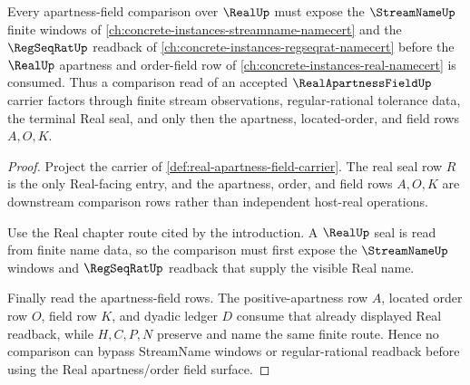 \begin{theorem}
\label{thm:real-apartness-field-streamname-dependency}
Every apartness-field comparison over $\RealUp$ must expose the $\StreamNameUp$ finite windows of \autoref{ch:concrete-instances-streamname-namecert} and the $\RegSeqRatUp$ readback of \autoref{ch:concrete-instances-regseqrat-namecert} before the $\RealUp$ apartness and order-field row of \autoref{ch:concrete-instances-real-namecert} is consumed. Thus a comparison read of an accepted $\RealApartnessFieldUp$ carrier factors through finite stream observations, regular-rational tolerance data, the terminal Real seal, and only then the apartness, located-order, and field rows $A,O,K$.
\end{theorem}
\begin{proof}
Project the carrier of \autoref{def:real-apartness-field-carrier}. The real seal row $R$ is the only Real-facing entry, and the apartness, order, and field rows $A,O,K$ are downstream comparison rows rather than independent host-real operations.

Use the Real chapter route cited by the introduction. A $\RealUp$ seal is read from finite name data, so the comparison must first expose the $\StreamNameUp$ windows and $\RegSeqRatUp$ readback that supply the visible Real name.

Finally read the apartness-field rows. The positive-apartness row $A$, located order row $O$, field row $K$, and dyadic ledger $D$ consume that already displayed Real readback, while $H,C,P,N$ preserve and name the same finite route. Hence no comparison can bypass StreamName windows or regular-rational readback before using the Real apartness/order field surface.
\end{proof}

